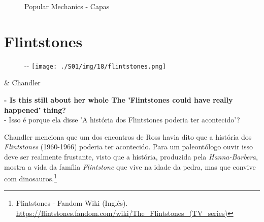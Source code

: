 \begin{figure}
  \centering
    \caption{Popular Mechanics - Capas\label{fig:popular-mechanics-capas}}
\end{figure}

\hypertarget{flintstones}{%
\section{Flintstones}\label{flintstones}}

\begin{figure}[!ht]
  \begin{adjustwidth}{-\oddsidemargin-1in}{-\rightmargin}
    \centering
    \texttt{[image: ./S01/img/18/flintstones.png]}
  \end{adjustwidth}
\end{figure}

\begin{tcolorbox}[enhanced,center upper,
    drop fuzzy shadow southeast, boxrule=0.3pt,
    lower separated=false, breakable,
    colframe=black!30!dialogoBorder,colback=white]
\begin{minipage}[c]{0.16\linewidth}
   & \centering \scriptsize{Chandler}
\end{minipage}
\hfill
\begin{minipage}[c]{0.8\linewidth}
  \textbf{- Is this still about her whole The 'Flintstones could have really happened' thing?}\\
  - Isso é porque ela disse 'A história dos Flintstones poderia ter acontecido'?
\end{minipage}
\end{tcolorbox}

Chandler menciona que um dos encontros de Ross havia dito que a história
dos \emph{Flintstones} (1960-1966) poderia ter acontecido. Para um
paleontólogo ouvir isso deve ser realmente frustante, visto que a
história, produzida pela \emph{Hanna-Barbera}, mostra a vida da família
\emph{Flintstone} que vive na idade da pedra, mas que convive com
dinosauros.\footnote{\sloppy Flintstones - Fandom Wiki (Inglês). \url{https://flintstones.fandom.com/wiki/The_Flintstones_(TV_series)}}


